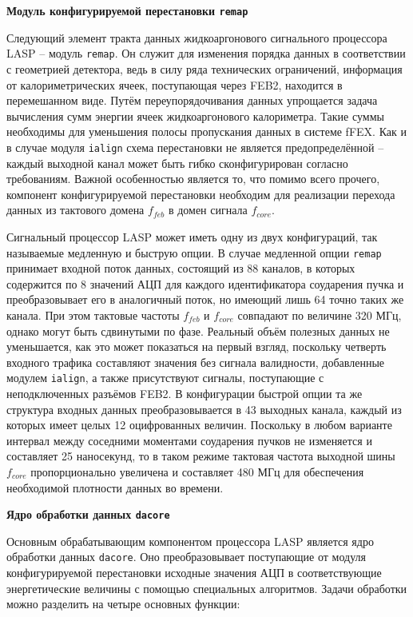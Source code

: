 \textbf{Модуль конфигурируемой перестановки \texttt{remap}}\par
Следующий элемент тракта данных жидкоаргонового сигнального процессора LASP -- модуль \texttt{remap}. Он служит для изменения порядка данных в соответствии с геометрией детектора, ведь в силу ряда технических ограничений, информация от калориметрических ячеек, поступающая через FEB2, находится в перемешанном виде. Путём переупорядочивания данных упрощается задача вычисления сумм энергии ячеек жидкоаргонового калориметра. Такие суммы необходимы для уменьшения полосы пропускания данных в системе fFEX. Как и в случае модуля \texttt{ialign} схема перестановки не является предопределённой -- каждый выходной канал может быть гибко сконфигурирован согласно требованиям. Важной особенностью является то, что помимо всего прочего, компонент конфигурируемой перестановки необходим для реализации перехода данных из тактового домена $f_{feb}$ в домен сигнала $f_{core}$.\par
Сигнальный процессор LASP может иметь одну из двух конфигураций, так называемые медленную и быструю опции. В случае медленной опции \texttt{remap} принимает входной поток данных, состоящий из 88 каналов, в которых содержится по 8 значений АЦП для каждого идентификатора соударения пучка и преобразовывает его в аналогичный поток, но имеющий лишь 64 точно таких же канала. При этом тактовые частоты $f_{feb}$ и $f_{core}$ совпадают по величине 320 МГц, однако могут быть сдвинутыми по фазе. Реальный объём полезных данных не уменьшается, как это может показаться на первый взгляд, поскольку четверть входного трафика составляют значения без сигнала валидности, добавленные модулем \texttt{ialign}, а также присутствуют сигналы, поступающие с неподключенных разъёмов FEB2. В конфигурации быстрой опции та же структура входных данных преобразовывается в 43 выходных канала, каждый из которых имеет целых 12 оцифрованных величин. Поскольку в любом варианте интервал между соседними моментами соударения пучков не изменяется и составляет 25 наносекунд, то в таком режиме тактовая частота выходной шины $f_{core}$ пропорционально увеличена и составляет 480 МГц для обеспечения необходимой плотности данных во времени.\par
\textbf{Ядро обработки данных \texttt{dacore}}\par
Основным обрабатывающим компонентом процессора LASP является ядро обработки данных \texttt{dacore}. Оно преобразовывает поступающие от модуля конфигурируемой перестановки исходные значения АЦП в соответствующие энергетические величины с помощью специальных алгоритмов. Задачи обработки можно разделить на четыре основных функции:\par
